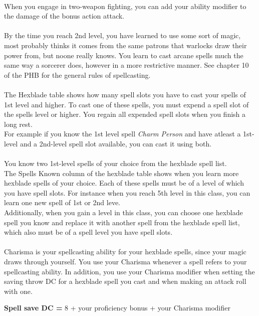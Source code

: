 \documentclass[a4paper]{article}
\begin{document}
\begin{multicols}{2}
\\
When you engage in two-weapon fighting, you can add your ability modifier to the damage of the bonus action attack.\\
\\
By the time you reach 2nd level, you have learned to use some sort of magic, most probably thinks it comes from the same patrons that warlocks draw their power from, but noone really knows. You learn to cast arcane spells much the same way a sorcerer does, however in a more restrictive manner. See chapter 10 of the PHB for the general rules of spellcasting.\\
\\
The Hexblade table shows how many spell slots you have to cast your spells of 1st level and higher. To cast one of these spells, you must expend a spell slot of the spells level or higher. You regain all expended spell slots when you finish a long rest.\\
\indent For example if you know the 1st level spell \textit{Charm Person} and have atleast a 1st-level and a 2nd-level spell slot available, you can cast it using both.\\
\\
You know two 1st-level spells of your choice from the hexblade spell list.\\
\indent The Spells Known column of the hexblade table shows when you learn more hexblade spells of your choice. Each of these spells must be of a level of which you have spell slots. For instance when you reach 5th level in this class, you can learn one new spell of 1st or 2nd leve. \\
\indent Additionally, when you gain a level in this class, you can choose one hexblade spell you know and replace it with another spell from the hexblade spell list, which also must be of a spell level you have spell slots.\\\\
Charisma is your spellcasting ability for your hexblade spells, since your magic draws through yourself. You use your Charisma whenever a spell refers to your spellcasting ability. In addition, you use your Charisma modifier when setting the saving throw DC for a hexblade spell you cast and when making an attack roll with one.
\begin{center}
\textbf{Spell save DC =} 8 + your proficiency bonus + your Charisma modifier\\

\end{center}
\end{multicols}
\end{document}
